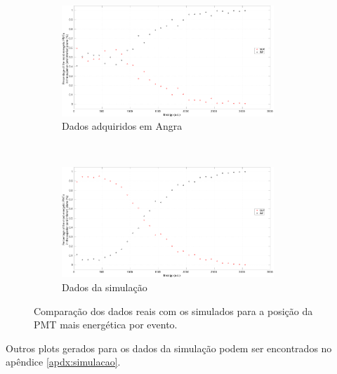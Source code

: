 \begin{figure}[h]
	\centering
	\begin{subfigure}{0.5\textwidth}
		\centering
	\includegraphics[width=8cm]{textuais/simulacao/figuras/probsupinf_real.pdf}
		\caption{Dados adquiridos em Angra}
		\label{fig:a}
	\end{subfigure}%
	~ 
	\begin{subfigure}{0.5\textwidth}
		\centering
	\includegraphics[width=8cm]{textuais/simulacao/figuras/probsupinf_sim.pdf}
		\caption{Dados da simulação}
				\label{fig:b}
	\end{subfigure}
	\caption{Comparação dos dados reais com os simulados para a posição da PMT mais energética por evento.}
\end{figure}

Outros plots gerados para os dados da simulação podem ser encontrados no apêndice \ref{apdx:simulacao}.
